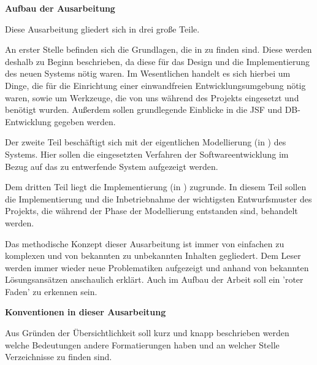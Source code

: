 \textbf{Aufbau der Ausarbeitung}

Diese Ausarbeitung gliedert sich in drei große Teile. 

An erster Stelle befinden sich die Grundlagen, die in  zu finden sind. Diese werden deshalb zu Beginn beschrieben, da diese für das Design und die Implementierung des neuen Systems nötig waren.
Im Wesentlichen handelt es sich hierbei um Dinge, die für die Einrichtung einer einwandfreien Entwicklungsumgebung nötig waren, sowie um Werkzeuge, die von uns während des Projekts eingesetzt und benötigt wurden. Außerdem sollen grundlegende Einblicke in die \ac{JSF} und \ac{DB}-Entwicklung gegeben werden.

Der zweite Teil beschäftigt sich mit der eigentlichen Modellierung (in ) des Systems. Hier sollen die eingesetzten Verfahren der Softwareentwicklung im Bezug auf das zu entwerfende System aufgezeigt werden.

Dem dritten Teil liegt die Implementierung (in ) zugrunde. 
In diesem Teil sollen die Implementierung und die Inbetriebnahme der wichtigsten Entwurfsmuster des Projekts, die während der Phase der Modellierung entstanden sind, behandelt werden. 

Das methodische Konzept dieser Ausarbeitung ist immer von einfachen zu komplexen und von bekannten zu unbekannten Inhalten gegliedert. Dem Leser werden immer wieder neue Problematiken aufgezeigt und anhand von bekannten Lösungsansätzen anschaulich erklärt. Auch im Aufbau der Arbeit soll ein 'roter Faden' zu erkennen sein. 

\textbf{Konventionen in dieser Ausarbeitung}

Aus Gründen der Übersichtlichkeit soll kurz und knapp beschrieben werden welche Bedeutungen andere Formatierungen haben und an welcher Stelle Verzeichnisse zu finden sind.

